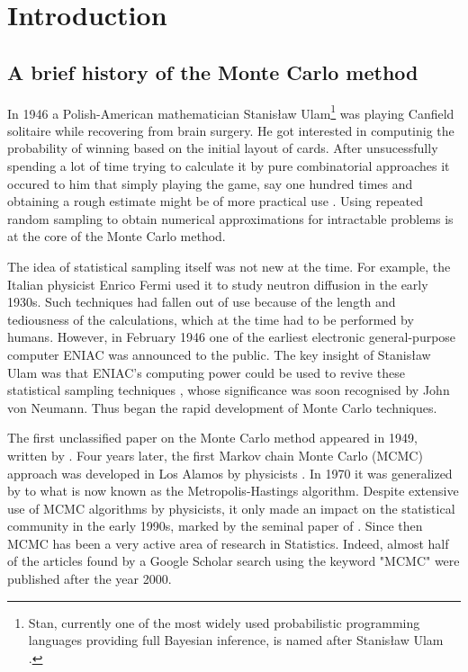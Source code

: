 \documentclass[report.tex]{subfiles}
\begin{document}
\chapter{Introduction}

\section{A brief history of the Monte Carlo method}
\label{chapter1-introduction}

In 1946 a Polish-American mathematician Stanisław Ulam\footnote{
  Stan, currently one of the most widely used probabilistic programming languages
  providing full Bayesian inference, is named after Stanisław Ulam
  \cite{stanReferenceManual}.
}
was playing Canfield solitaire while recovering from brain surgery.
He got interested in computinig the probability of winning based on the initial
layout of cards. After unsucessfully spending a lot of time trying to calculate it
by pure combinatorial approaches it occured to him that simply playing the
game, say one hundred times and obtaining a rough estimate might be of more
practical use \cite{eckhardt1987stan}. Using repeated random sampling
to obtain numerical approximations for intractable problems is at the
core of the Monte Carlo method.

The idea of statistical sampling itself was not new at the time. For example,
the Italian physicist Enrico Fermi used it to study neutron diffusion in the
early 1930s. Such techniques had fallen out of use because of the
length and tediousness of the calculations, which at the time had to be
performed by humans. However, in February 1946 one of the earliest electronic
general-purpose computer ENIAC was announced to the public. The key insight of
Stanisław Ulam was that ENIAC's computing power could be used to revive these
statistical sampling techniques \cite{metropolis1987beginning}, whose significance
was soon recognised by John von Neumann. Thus began the rapid development of
Monte Carlo techniques.

The first unclassified paper on the Monte Carlo method appeared in 1949, written
by \citet{metropolis1949monte}. Four years later, the first Markov chain Monte Carlo
(MCMC) approach was developed in Los Alamos by physicists \citet{metropolis1953equation}.
In 1970 it was generalized by \citet{hastings1970monte} to what is now
known as the Metropolis-Hastings algorithm. Despite extensive
use of MCMC algorithms by physicists, it only made an impact on the statistical
community in the early 1990s, marked by the seminal paper of
\citet{gelfand1990sampling}. Since then MCMC has been a very active area of
research in Statistics. Indeed, almost half of the articles found by a
Google Scholar search using the keyword "MCMC" were published after the year 2000.
\end{document}
